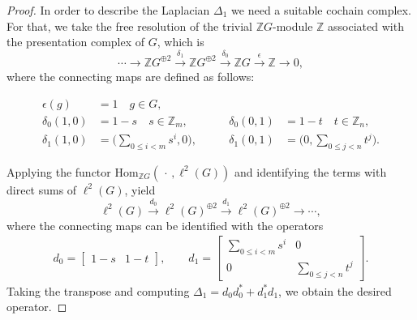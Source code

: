 \documentclass[a4paper,leqno,12pt]{article}
\numberwithin{equation}{section}
\theoremstyle{plain}
\theoremstyle{definition}
\theoremstyle{remark}
\begin{document}
	\begin{proof}
		In order to describe the Laplacian $\Delta_1$ we need a suitable cochain complex. For that, we take the free resolution of the trivial $\mathbb ZG$-module $\mathbb Z$ associated with the presentation complex of $G$, which is
		\begin{equation*}
			\cdots 
			\longrightarrow 
			\mathbb Z G^{\oplus 2} 
			\stackrel{\delta_1}\longrightarrow 
			\mathbb Z G ^ {\oplus  2} 
			\stackrel{\delta_0}\longrightarrow 
			\mathbb ZG 
			\stackrel{\epsilon}\longrightarrow 
			\mathbb Z 
			\longrightarrow
			0 ,
		\end{equation*}
		where the connecting maps are defined as follows:

\[
\begin{aligned}
\epsilon(g) &= 1 \quad g\in G, \\[6pt]
\delta_0(1,0) &= 1-s \quad s\in \mathbb Z_m ,
&\qquad
\delta_0(0,1) &= 1-t \quad t\in \mathbb Z_n,\\[4pt]
\delta_1(1,0) &= \bigl(\sum_{0 \le i < m} s^i, 0\bigr),
&\qquad
\delta_1(0,1) &= \bigl(0, \sum_{0 \le j < n} t^j\bigr).
\end{aligned}
\]
       
		Applying the functor $\mathrm {Hom}_{\mathbb Z G}( \,\cdot \,, \ell^ 2(G))$ and identifying the terms with direct sums of $\ell^2(G)$, yield
		\begin{equation*}
			\ell^ 2 (G) 
			\stackrel{d_0}\longrightarrow 
			\ell^ 2(G)^ {\oplus  2} 
			\stackrel{d_1}\longrightarrow
			\ell^ 2(G)^ {\oplus 2}
			\longrightarrow 
			\cdots,
		\end{equation*}
		where the connecting maps can be identified with the operators
		\begin{gather*}
			d_0 = \begin{bmatrix}
				1-s & 1-t
			\end{bmatrix}, \qquad 
			d_1 = \begin{bmatrix}
				\sum_{0 \leq i < m} s^i & 0 
				\\
				0   & \sum_{0 \leq j < n} t^j
			\end{bmatrix}.
		\end{gather*}
		Taking the transpose and computing $\Delta_1 = d_0d_0^*+d_1^*d_1$, we obtain the desired operator.
	\end{proof}
	
\end{document}
